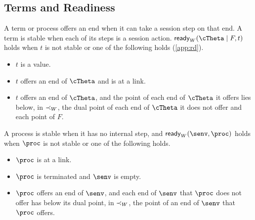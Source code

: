 
\subsection{Terms and Readiness}
\label{sec:term-rel}

\begin{definition}
\label{def:readiness}
A term or process offers an end when it can take a session step on that end. A term is stable when each of its steps is a session action.
$\ready_W(\cTheta \mid F, t)$ holds when $t$ is not stable or one of the following holds (\cref{app:rd}).
\begin{itemize}
  \item $t$ is a value.
  \item $t$ offers an end of $\cTheta$ and is at a link.
  \item $t$ offers an end of $\cTheta$, and the point of each end of $\cTheta$ it offers lies below, in $\prec_{W}$, the dual point of each end of $\cTheta$ it does not offer and each point of $F$.
\end{itemize}
A process is stable when it has no internal step, and $\ready_W(\senv, \proc)$ holds when $\proc$ is not stable or one of the following holds.
\begin{itemize}
  \item $\proc$ is at a link.
  \item $\proc$ is terminated and $\senv$ is empty.
  \item $\proc$ offers an end of $\senv$, and each end of $\senv$ that $\proc$ does not offer has below its dual point, in $\prec_{W}$, the point of an end of $\senv$ that $\proc$ offers.
\end{itemize}
\end{definition}



